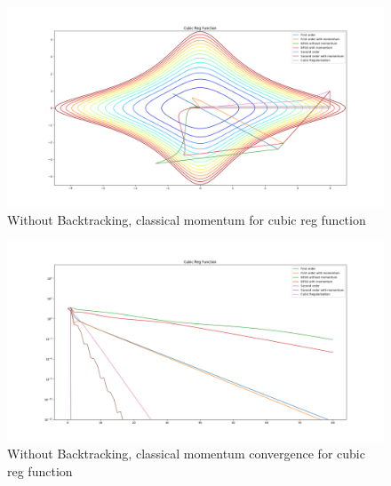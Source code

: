 \documentclass{article}
\begin{document}
\begin{figure}[H]
	\includegraphics[width=\linewidth]{../Images/cubicregularizationmomentum.png}
	\caption{Without Backtracking, classical momentum for cubic reg function}
	\label{fig:Without Backtracking, classical momentum for cubic reg function}
\end{figure}

\begin{figure}[H]
	\includegraphics[width=\linewidth]{../Images/cubicregularizationmomentum1.png}
	\caption{Without Backtracking, classical momentum convergence for cubic reg function}
	\label{fig:Without Backtracking, classical momentum convergence for cubic reg function}
\end{figure}
\end{document}
